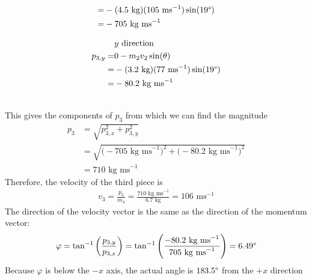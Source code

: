 \documentclass[a4paper]{article}
\let\phi\varphi
\begin{document}
\begin{shaded}
\begin{minipage}{0.45\textwidth}
\begin{align*}
            =& -(4.5\text{ kg})(105\text{ ms}^{-1})\sin(19\degree)\\
            =& -705\text{ kg\ ms}^{-1}
        \end{align*}
    \end{minipage}
    \begin{minipage}{0.45\textwidth}
        \begin{align*}
            &\text{$y$ direction}\\
            p_{3,y} =& 0 - m_2v_2\sin(\theta)\\
            =& -(3.2\text{ kg})(77\text{ ms}^{-1})\sin(19\degree)\\
            =& -80.2\text{ kg\ ms}^{-1}
        \end{align*}
    \end{minipage}\\
    This gives the components of $p_3$ from which we can find the magnitude
    \begin{align*}
        p_3 &= \sqrt{p_{3,x}^2 + p_{3,y}^2}\\
        &= \sqrt{\Big(-705\text{ kg\ ms}^{-1}\Big)^2 + \Big(-80.2\text{ kg\ ms}^{-1}\Big)^2}\\
        &= 710\text{ kg\ ms}^{-1}
    \end{align*}
    Therefore, the velocity of the third piece is
    \begin{align*}
        v_3 = \frac{p_3}{m_3} = \frac{710\text{ kg\ ms}^{-1}}{6.7\text{ kg}} = 106\text{ ms}^{-1}
    \end{align*}
    The direction of the velocity vector is the same as the direction of the momentum vector:
    \begin{align*}
        \phi = \tan^{-1}\bigg(\frac{p_{3,y}}{p_{3,x}}\bigg) = \tan^{-1}\Bigg(\frac{-80.2\text{ kg\ ms}^{-1}}{705\text{ kg\ ms}^{-1}}\Bigg) = 6.49\degree
    \end{align*}
    Because $\phi$ is below the $-x$ axis, the actual angle is $183.5\degree$ from the $+x$ direction
\end{shaded}
\end{document}
